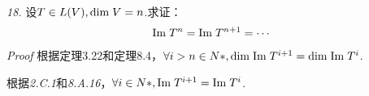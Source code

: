 \hspace*{\fill}

\textit{18.}
设\(T \in L(V),\mathrm{dim \;} V=n\).求证：
    \begin{align*}
        \mathrm{Im \;} T^n=\mathrm{Im \;} T^{n+1}=\cdots
    \end{align*}
\textit{Proof}
根据定理3.22和定理8.4，\(\forall i>n \in N*,\mathrm{dim \;} \mathrm{Im \;} T^{i+1}=\mathrm{dim \;} \mathrm{Im \;} T^i\).

根据\textit{2.C.1}和\textit{8.A.16}，\(\forall i \in N*,\mathrm{Im \;} T^{i+1}=\mathrm{Im \;} T^i\).

